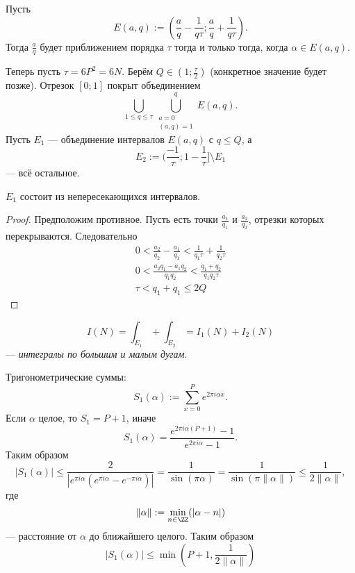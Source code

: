 \documentclass[12pt,a4paper]{article}
\begin{document}
    \begin{remark}
        Пусть
        \[E(a, q) := (\frac{a}{q} - \frac{1}{q \tau}; \frac{a}{q} + \frac{1}{q \tau}).\]
        Тогда $\frac{a}{q}$ будет приближением порядка $\tau$ тогда и только тогда, когда $\alpha \in E(a, q)$.
    \end{remark}

    Теперь пусть $\tau = 6 P^2 = 6N$. Берём $Q \in (1; \frac{\tau}{2})$ (конкретное значение будет позже). Отрезок $[0; 1]$ покрыт объединением
    \[\bigcup_{1 \leqslant q \leqslant \tau} \bigcup_{\substack{a = 0\\ (a, q) = 1}}^q E(a, q).\]
    Пусть $E_1$ --- объединение интервалов $E(a, q)$ с $q \leqslant Q$, а
    \[E_2 := (\frac{-1}{\tau}; 1 - \frac{1}{\tau}] \setminus E_1\]
    --- всё остальное.

    \begin{theorem}
        $E_1$ состоит из непересекающихся интервалов.
    \end{theorem}

    \begin{proof}
        Предположим противное. Пусть есть точки $\frac{a_1}{q_1}$ и $\frac{a_2}{q_2}$, отрезки которых перекрываются. Следовательно
        \begin{gather*}
            0 < \frac{a_2}{q_2} - \frac{a_1}{q_1} < \frac{1}{q_1 \tau} + \frac{1}{q_2 \tau}\\
            0 < \frac{a_2 q_1 - a_1 q_2}{q_1 q_2} < \frac{q_1 + q_2}{q_1 q_2 \tau}\\
            \tau < q_1 + q_1 \leqslant 2Q
        \end{gather*}
    \end{proof}

    \[I(N) = \int_{E_1} + \int_{E_2} = I_1(N) + I_2(N)\]
    --- \emph{интегралы по большим и малым дугам}.

    Тригонометрические суммы:
    \[S_1(\alpha) := \sum_{x=0}^P e^{2 \pi i \alpha x}.\]
    Если $\alpha$ целое, то $S_1 = P+1$, иначе
    \[S_1(\alpha) = \frac{e^{2 \pi i \alpha (P+1)} - 1}{e^{2 \pi i \alpha} - 1}.\]
    Таким образом
    \[|S_1(\alpha)| \leqslant \frac{2}{|e^{\pi i \alpha}(e^{\pi i \alpha} - e^{-\pi i \alpha})|} = \frac{1}{\sin(\pi \alpha)} = \frac{1}{\sin(\pi \|\alpha\|)} \leqslant \frac{1}{2 \|\alpha\|},\]
    где
    \[\|\alpha\| := \min_{n \in \ZZ}(|\alpha - n|)\]
    --- расстояние от $\alpha$ до ближайшего целого. Таким образом
    \[|S_1(\alpha)| \leqslant \min\left(P+1, \frac{1}{2\|\alpha\|}\right)\]
\end{document}

